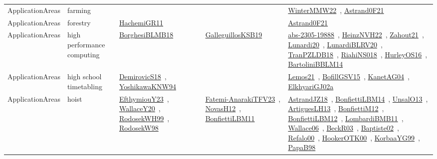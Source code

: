 {\begin{longtable}{lp{3cm}>{\raggedright\arraybackslash}p{6cm}>{\raggedright\arraybackslash}p{6cm}>{\raggedright\arraybackslash}p{8cm}}
ApplicationAreas & farming &  &  & \href{../works/WinterMMW22.pdf}{WinterMMW22}~\cite{WinterMMW22}, \href{../works/Astrand0F21.pdf}{Astrand0F21}~\cite{Astrand0F21}\\
ApplicationAreas & forestry & \href{../works/HachemiGR11.pdf}{HachemiGR11}~\cite{HachemiGR11} &  & \href{../works/Astrand0F21.pdf}{Astrand0F21}~\cite{Astrand0F21}\\
ApplicationAreas & high performance computing & \href{../works/BorghesiBLMB18.pdf}{BorghesiBLMB18}~\cite{BorghesiBLMB18} & \href{../works/GalleguillosKSB19.pdf}{GalleguillosKSB19}~\cite{GalleguillosKSB19} & \href{../works/abs-2305-19888.pdf}{abs-2305-19888}~\cite{abs-2305-19888}, \href{../works/HeinzNVH22.pdf}{HeinzNVH22}~\cite{HeinzNVH22}, \href{../works/Zahout21.pdf}{Zahout21}~\cite{Zahout21}, \href{../works/Lunardi20.pdf}{Lunardi20}~\cite{Lunardi20}, \href{../works/LunardiBLRV20.pdf}{LunardiBLRV20}~\cite{LunardiBLRV20}, \href{../works/TranPZLDB18.pdf}{TranPZLDB18}~\cite{TranPZLDB18}, \href{../works/RiahiNS018.pdf}{RiahiNS018}~\cite{RiahiNS018}, \href{../works/HurleyOS16.pdf}{HurleyOS16}~\cite{HurleyOS16}, \href{../works/BartoliniBBLM14.pdf}{BartoliniBBLM14}~\cite{BartoliniBBLM14}\\
ApplicationAreas & high school timetabling & \href{../works/DemirovicS18.pdf}{DemirovicS18}~\cite{DemirovicS18}, \href{../works/YoshikawaKNW94.pdf}{YoshikawaKNW94}~\cite{YoshikawaKNW94} &  & \href{../works/Lemos21.pdf}{Lemos21}~\cite{Lemos21}, \href{../works/BofillGSV15.pdf}{BofillGSV15}~\cite{BofillGSV15}, \href{../works/KanetAG04.pdf}{KanetAG04}~\cite{KanetAG04}, \href{../works/ElkhyariGJ02a.pdf}{ElkhyariGJ02a}~\cite{ElkhyariGJ02a}\\
ApplicationAreas & hoist & \href{../works/EfthymiouY23.pdf}{EfthymiouY23}~\cite{EfthymiouY23}, \href{../works/WallaceY20.pdf}{WallaceY20}~\cite{WallaceY20}, \href{../works/RodosekWH99.pdf}{RodosekWH99}~\cite{RodosekWH99}, \href{../works/RodosekW98.pdf}{RodosekW98}~\cite{RodosekW98} & \href{../works/Fatemi-AnarakiTFV23.pdf}{Fatemi-AnarakiTFV23}~\cite{Fatemi-AnarakiTFV23}, \href{../works/NovasH12.pdf}{NovasH12}~\cite{NovasH12}, \href{../works/BonfiettiLBM11.pdf}{BonfiettiLBM11}~\cite{BonfiettiLBM11} & \href{../works/AstrandJZ18.pdf}{AstrandJZ18}~\cite{AstrandJZ18}, \href{../works/BonfiettiLBM14.pdf}{BonfiettiLBM14}~\cite{BonfiettiLBM14}, \href{../works/UnsalO13.pdf}{UnsalO13}~\cite{UnsalO13}, \href{../works/ArtiguesLH13.pdf}{ArtiguesLH13}~\cite{ArtiguesLH13}, \href{../works/BonfiettiM12.pdf}{BonfiettiM12}~\cite{BonfiettiM12}, \href{../works/BonfiettiLBM12.pdf}{BonfiettiLBM12}~\cite{BonfiettiLBM12}, \href{../works/LombardiBMB11.pdf}{LombardiBMB11}~\cite{LombardiBMB11}, \href{../works/Wallace06.pdf}{Wallace06}~\cite{Wallace06}, \href{../works/BeckR03.pdf}{BeckR03}~\cite{BeckR03}, \href{../works/Baptiste02.pdf}{Baptiste02}~\cite{Baptiste02}, \href{../works/Refalo00.pdf}{Refalo00}~\cite{Refalo00}, \href{../works/HookerOTK00.pdf}{HookerOTK00}~\cite{HookerOTK00}, \href{../works/KorbaaYG99.pdf}{KorbaaYG99}~\cite{KorbaaYG99}, \href{../works/PapaB98.pdf}{PapaB98}~\cite{PapaB98}\\

\end{longtable}}
